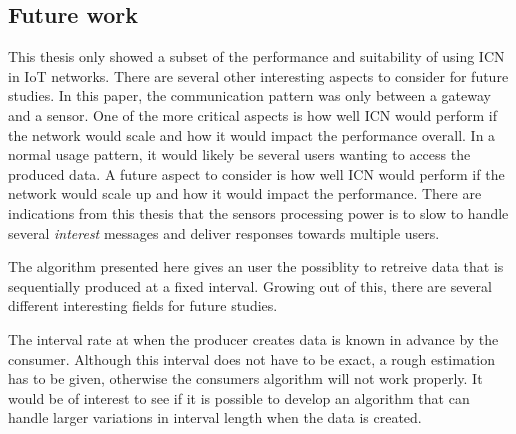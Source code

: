 \subsection{Future work}
This thesis only showed a subset of the performance and suitability of using ICN in IoT networks. There are several other interesting aspects to consider for future studies. 
In this paper, the communication pattern was only between a gateway and a sensor. One of the more critical aspects is how well ICN would perform if the network would scale and how it would impact the performance overall. 
In a normal usage pattern, it would likely be several users wanting to access the produced data. A future aspect to consider is how well ICN would perform if the network would scale up and how it would impact the performance. There are indications from this thesis that the sensors processing power is to slow to handle several \textit{interest} messages and deliver responses towards multiple users.

The algorithm presented here gives an user the possiblity to retreive data that is sequentially produced at a fixed interval. Growing out of this, there are several different interesting fields for future studies.

The interval rate at when the producer creates data is known in advance by the consumer. Although this interval does not have to be exact, a rough estimation has to be given, otherwise the consumers algorithm will not work properly. It would be of interest to see if it is possible to develop an algorithm that can handle larger variations in interval length when the data is created. 





